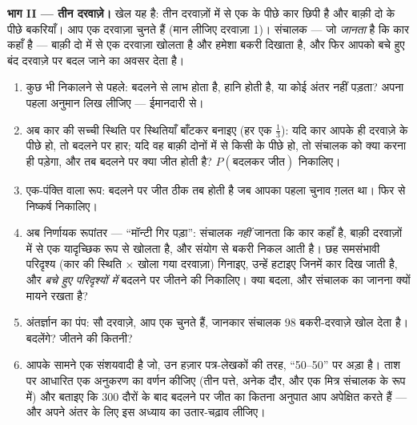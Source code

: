 \begin{problem}
\medskip
\noindent\textbf{भाग II --- तीन दरवाज़े।}
खेल यह है: तीन दरवाज़ों में से एक के पीछे कार छिपी है और बाक़ी दो के पीछे
बकरियाँ। आप एक दरवाज़ा चुनते हैं (मान लीजिए दरवाज़ा 1)। संचालक --- जो
\emph{जानता} है कि कार कहाँ है --- बाक़ी दो में से एक दरवाज़ा खोलता है और
हमेशा बकरी दिखाता है, और फिर आपको बचे हुए बंद दरवाज़े पर बदल जाने का अवसर
देता है।
\begin{enumerate}[resume]
  \item कुछ भी निकालने से पहले: बदलने से लाभ होता है, हानि होती है, या कोई
        अंतर नहीं पड़ता? अपना पहला अनुमान लिख लीजिए --- ईमानदारी से।
  \item अब कार की सच्ची स्थिति पर स्थितियाँ बाँटकर  बनाइए (हर एक
        $\frac13$): यदि कार आपके ही दरवाज़े के पीछे हो, तो बदलने पर हार;
        यदि वह बाक़ी दोनों में से किसी के पीछे हो, तो संचालक को क्या करना
        ही पड़ेगा, और तब बदलने पर क्या जीत होती है? $P(\text{बदलकर जीत})$ निकालिए।
  \item एक-पंक्ति वाला रूप: बदलने पर जीत ठीक तब होती है जब आपका पहला चुनाव
        ग़लत था। फिर से निष्कर्ष निकालिए।
  \item अब निर्णायक रूपांतर --- ``मॉन्टी गिर पड़ा'': संचालक \emph{नहीं}
        जानता कि कार कहाँ है, बाक़ी दरवाज़ों में से एक यादृच्छिक रूप से
        खोलता है, और संयोग से बकरी निकल आती है। छह समसंभावी परिदृश्य
        (कार की स्थिति $\times$ खोला गया दरवाज़ा) गिनाइए, उन्हें हटाइए जिनमें
        कार दिख जाती है, और \emph{बचे हुए परिदृश्यों में} बदलने पर जीतने
        की  निकालिए। क्या बदला, और संचालक का जानना क्यों मायने
        रखता है?
  \item अंतर्ज्ञान का पंप: सौ दरवाज़े, आप एक चुनते हैं, जानकार संचालक $98$
        बकरी-दरवाज़े खोल देता है। बदलेंगे? जीतने की  कितनी?
  \item आपके सामने एक संशयवादी है जो, उन हज़ार पत्र-लेखकों की तरह,
        ``50--50'' पर अड़ा है। ताश पर आधारित एक अनुकरण का वर्णन कीजिए (तीन
        पत्ते, अनेक दौर, और एक मित्र संचालक के रूप में) और बताइए कि $300$
        दौरों के बाद बदलने पर जीत का कितना अनुपात आप अपेक्षित करते हैं ---
        और अपने अंतर के लिए इस अध्याय का उतार-चढ़ाव  लीजिए।
\end{enumerate}


\end{problem}
